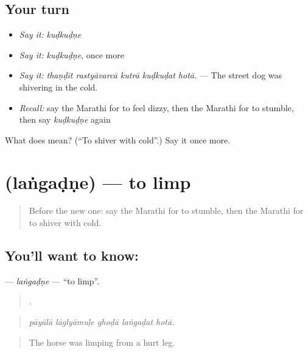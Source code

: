 \subsection*{Your turn}
\begin{itemize}
\raggedright
  \item \emph{Say it:} \emph{kuḍkuḍṇe}
  \item \emph{Say it:} \emph{kuḍkuḍṇe}, once more
  \item \emph{Say it:} \emph{thaṇḍīt rastyāvarcā kutrā kuḍkuḍat hotā.} — The street dog was shivering in the cold.
  \item \emph{Recall:} say the Marathi for to feel dizzy, then the Marathi for to stumble, then say \emph{kuḍkuḍṇe} again
\end{itemize}

\begin{tcolorbox}[breakable,colback=teal!4,colframe=teal!35!black,title={Before you move on}]
What does  mean? (\textquotedblleft{}To shiver with cold\textquotedblright{}.) Say it once more.
\end{tcolorbox}
\section[\texorpdfstring{\mr{लंगडणे} (laṅgaḍṇe)}{लंगडणे (laṅgaḍṇe)}]{ (laṅgaḍṇe) — to limp}

\label{lesson:MR-C493-langadne}



\begin{quote}
Before the new one: say the Marathi for to stumble, then the Marathi for to shiver with cold.
\end{quote}

\subsection*{You'll want to know: }
\textbf{} — \emph{laṅgaḍṇe} — \textquotedblleft{}to limp\textquotedblright{}.

\begin{quote}
    .
\end{quote}

\begin{quote}
\emph{pāyālā lāglyāmuḷe ghoḍā laṅgaḍat hotā.}
\end{quote}

\begin{quote}
The horse was limping from a hurt leg.
\end{quote}

